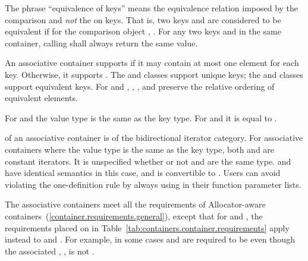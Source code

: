 \pnum
The phrase ``equivalence of keys'' means the equivalence relation imposed by the
comparison and
\textit{not}
the
on keys.
That is, two keys
and
are considered to be equivalent if for the
comparison object
,
.
For any two keys
and
in the same container, calling
shall always return the same value.

\pnum
An associative container supports  if it may contain at
most one element for each key. Otherwise, it supports .
The  and  classes support unique keys; the 
and  classes support equivalent keys.
For  and ,
, , and  preserve the relative ordering
of equivalent elements.

\pnum
For  and  the value type is the same as the key type.
For  and  it is equal to .

\pnum
{}
of an associative container is of the bidirectional iterator category.
For associative containers where the value type is the same as the key type, both
and
are constant iterators. It is unspecified whether or not
and
are the same type.
\enternote {} and  have identical semantics in this case, and  is convertible to . Users can avoid violating the one-definition rule by always using  in their function parameter lists. \exitnote

\pnum
The associative containers meet all the requirements of Allocator-aware
containers~(\ref{container.requirements.general}), except that for
 and , the requirements placed on 
in Table~\ref{tab:containers.container.requirements} apply instead to 
and . \enternote For example, in some cases  and 
are required to be  even though the associated
, , is not
. \exitnote

